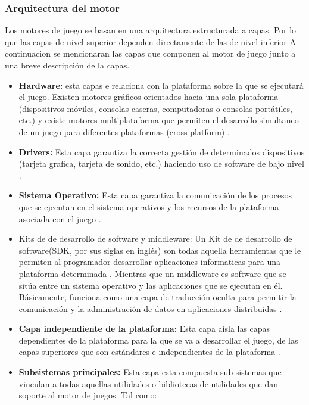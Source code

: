 \subsubsection{Arquitectura del motor}
Los motores de juego se basan en una arquitectura estructurada a capas. Por lo que las capas de nivel superior dependen directamente de las de nivel inferior \cite{Ref:ArquMotor} 
 A continuacion se mencionaran las capas que componen al motor de juego junto a una breve descripción de la capas.
 
 \begin{itemize}
 	\item \textbf{Hardware:} esta capas e relaciona con la plataforma sobre la que se ejecutará el juego. Existen motores gráficos orientados hacia una sola plataforma (dispositivos móviles, consolas caseras, computadoras o consolas portátiles, etc.) y existe motores multiplataforma que permiten el desarrollo simultaneo de un juego para diferentes plataformas (cross-platform) \cite{Ref:ArquMotor}.
 	\item \textbf{Drivers:} Esta capa garantiza la correcta gestión de determinados dispositivos (tarjeta grafica, tarjeta de sonido, etc.) haciendo uso de software de bajo nivel \cite{Ref:ArquMotor}. 
 	\item \textbf{Sistema Operativo:} Esta capa garantiza la comunicación de los procesos que se ejecutan en el sistema operativos y los recursos de la plataforma asociada con el juego \cite{Ref:ArquMotor}.
 	\item {Kits de de desarrollo de software y middleware:} Un Kit de de desarrollo de software(SDK, por sus siglas en inglés) son todas aquella herramientas que le permiten al programador desarrollar aplicaciones informaticas para una plataforma determinada \cite{ref:SDK}. Mientras que un middleware es software que se sitúa entre un sistema operativo y las aplicaciones que se ejecutan en él. Básicamente, funciona como una capa de traducción oculta para permitir la comunicación y la administración de datos en aplicaciones distribuidas \cite{Ref:middleware}. 
 	\item \textbf{Capa independiente de la plataforma:} Esta capa aísla las capas dependientes de la plataforma para la que se va a desarrollar el juego, de las capas superiores que son estándares e independientes de la plataforma \cite{Ref:ArquMotor}. 
 	\item \textbf{Subsistemas principales:} Esta capa esta compuesta sub sistemas que vinculan a todas aquellas utilidades o bibliotecas de utilidades que dan soporte al motor de juegos. Tal como:

\end{itemize}
